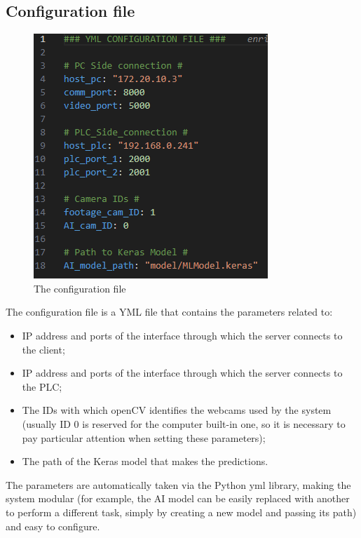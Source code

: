 \documentclass[a4paper,11pt]{report}
\theoremstyle{definition}
\theoremstyle{plain}
\begin{document}
        \subsection{Configuration file}
        \begin{figure}[H]
        \includegraphics[scale=0.7]{images/yml.png}
        \centering
        \caption{The configuration file}
        \end{figure}
        The configuration file is a YML file that contains the parameters related to:
        \begin{itemize}
            \item IP address and ports of the interface through which the server connects to the client;
            \item IP address and ports of the interface through which the server connects to the PLC;
            \item The IDs with which openCV identifies the webcams used by the system (usually ID 0 is reserved for the computer built-in one, so it is necessary to pay particular attention when setting these parameters);
            \item The path of the Keras model that makes the predictions.
        \end{itemize}
        The parameters are automatically taken via the Python yml library, making the system modular (for example, the AI model can be easily replaced with another to perform a different task, simply by creating a new model and passing its path) and easy to configure.
\end{document}
